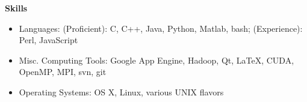 \documentclass[letterpaper,11pt]{article}
\newcommand{\desitem}[1]{\item #1 \vspace{-7pt}}
\newcommand{\resheading}[1]{{\large \colorbox{mygrey}{\begin{minipage}{\textwidth}{\textbf{#1 \vphantom{p\^{E}}}}\end{minipage}}}}
\begin{document}
\vspace{0.1in}

\resheading{Skills}
\begin{itemize}
    \desitem{Languages:
                    (Proficient): C, C++, Java, Python, Matlab, bash; (Experience): Perl, JavaScript}
    \desitem{Misc. Computing Tools:
                     Google App Engine, Hadoop, Qt, LaTeX, CUDA, OpenMP, MPI, svn, git}
    \desitem{Operating Systems:
                     OS X, Linux, various UNIX flavors}
\end{itemize}
\end{document}
